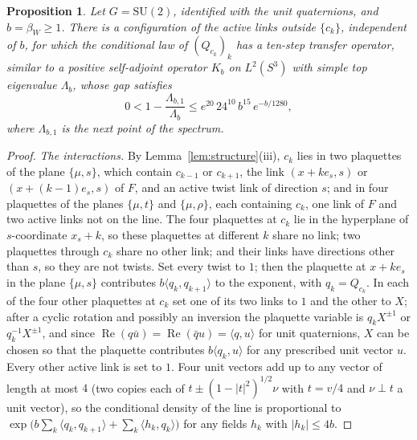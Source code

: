 \documentclass[11pt]{amsart}
\newtheorem{proposition}[theorem]{Proposition}
\theoremstyle{definition}
\theoremstyle{remark}
\numberwithin{equation}{section}
\newcommand{\SU}{\mathrm{SU}}
\newcommand{\ip}[2]{\langle #1,#2\rangle}
\begin{document}
\begin{proposition}\label{prop:slowline}
Let $G=\SU(2)$, identified with the unit quaternions, and $b=\beta_W\ge1$.
There is a configuration of the active links outside $\{c_k\}$, independent
of $b$, for which the conditional law of $(Q_{c_k})_k$ has a ten-step
transfer operator, similar to a positive self-adjoint operator $K_b$ on
$L^2(S^3)$ with simple top eigenvalue $\Lambda_b$, whose gap satisfies
\[
0<1-\frac{\Lambda_{b,1}}{\Lambda_b}\le e^{20}\,24^{10}\,b^{15}\,e^{-b/1280},
\]
where $\Lambda_{b,1}$ is the next point of the spectrum.
\end{proposition}

\begin{proof}
\emph{The interactions.} By Lemma~\ref{lem:structure}(iii), $c_k$ lies in
two plaquettes of the plane $\{\mu,s\}$, which contain $c_{k-1}$ or
$c_{k+1}$, the link $(x+ke_s,s)$ or $(x+(k-1)e_s,s)$ of $F$, and an active
twist link of direction $s$; and in four plaquettes of the planes
$\{\mu,t\}$ and $\{\mu,\rho\}$, each containing $c_k$, one link of $F$ and
two active links not on the line. The four plaquettes at $c_k$ lie in the
hyperplane of $s$-coordinate $x_s+k$, so these plaquettes at different $k$
share no link; two plaquettes through $c_k$ share no other link; and their
links have directions other than $s$, so they are not twists. Set every
twist to $1$; then the plaquette at $x+ke_s$ in the plane $\{\mu,s\}$
contributes $b\ip{q_k}{q_{k+1}}$ to the exponent, with $q_k=Q_{c_k}$. In each
of the four other plaquettes at $c_k$ set one of its two links to $1$ and the
other to $X$; after a cyclic rotation and possibly an inversion the plaquette
variable is $q_kX^{\pm1}$ or $q_k^{-1}X^{\pm1}$, and since $\operatorname{Re}
(q\bar u)=\operatorname{Re}(\bar qu)=\ip qu$ for unit quaternions, $X$ can be
chosen so that the plaquette contributes $b\ip{q_k}u$ for any prescribed unit
vector $u$. Every other active link is set to $1$. Four unit vectors add up
to any vector of length at most $4$ (two copies each of $t\pm(1-|t|^2)^{1/2}
\nu$ with $t=v/4$ and $\nu\perp t$ a unit vector), so the conditional density
of the line is proportional to $\exp\bigl(b\sum_k\ip{q_k}{q_{k+1}}+\sum_k\ip
{h_k}{q_k}\bigr)$ for any fields $h_k$ with $|h_k|\le4b$.


\end{proof}
\end{document}
